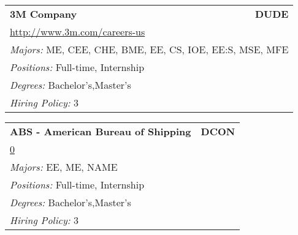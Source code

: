 \documentclass[twoside]{article}
\begin{document}
    \startcompanysection
    \begin{center}\begin{multicols}{3}
    \begin{FlushLeft}
    \begin{minipage}{\columnwidth}\begin{tabularx}{.95\columnwidth}{Xr}
                 {\Large\bf 3M Company} & {\Large\bf DUDE}\\
    \multicolumn{2}{p{.95\columnwidth}}{\url{http://www.3m.com/careers-us}}\\
    \multicolumn{2}{p{.95\columnwidth}}{\emph{Majors:} ME, CEE, CHE, BME, EE, CS, IOE, EE:S, MSE, MFE}\\
    \multicolumn{2}{p{.95\columnwidth}}{\emph{Positions:} Full-time, Internship}\\
    \multicolumn{2}{p{.95\columnwidth}}{\emph{Degrees:} Bachelor's,Master's}\\
    \multicolumn{2}{p{.95\columnwidth}}{\emph{Hiring Policy:} 3}\\
    \end{tabularx}
    
\end{minipage}
 
\begin{minipage}{\columnwidth}\begin{tabularx}{.95\columnwidth}{Xr}
                 {\Large\bf ABS - American Bureau of Shipping} & {\Large\bf DCON}\\
    \multicolumn{2}{p{.95\columnwidth}}{\url{0}}\\
    \multicolumn{2}{p{.95\columnwidth}}{\emph{Majors:} EE, ME, NAME}\\
    \multicolumn{2}{p{.95\columnwidth}}{\emph{Positions:} Full-time, Internship}\\
    \multicolumn{2}{p{.95\columnwidth}}{\emph{Degrees:} Bachelor's,Master's}\\
    \multicolumn{2}{p{.95\columnwidth}}{\emph{Hiring Policy:} 3}\\
    \end{tabularx}
    
\end{minipage}
 

\end{FlushLeft}
\end{multicols}
\end{center}
\end{document}
